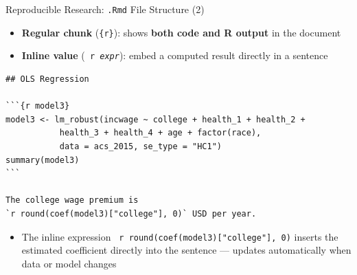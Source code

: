 \documentclass[dvipsnames,hyperref={pdfpagelabels=false}]{beamer}
\begin{document}
\begin{frame}[fragile]{Reproducible Research: \texttt{.Rmd} File Structure (2)}

	\begin{itemize}
		\item \textbf{Regular chunk} (\texttt{\{r\}}): shows \textbf{both code and R output} in the document
		\vspace{0.2cm}
		\item \textbf{Inline value} (\texttt{{} r \textit{expr}{}}): embed a computed result directly in a sentence
	\end{itemize}

\begin{lstlisting}[language={},basicstyle=\ttfamily\fontsize{7.5}{9}\selectfont,keywordstyle={}]
## OLS Regression

```{r model3}
model3 <- lm_robust(incwage ~ college + health_1 + health_2 +
           health_3 + health_4 + age + factor(race),
           data = acs_2015, se_type = "HC1")
summary(model3)
```

The college wage premium is
`r round(coef(model3)["college"], 0)` USD per year.
\end{lstlisting}

	\begin{itemize}
		\item The inline expression \texttt{{} r round(coef(model3)["college"], 0){}} inserts the estimated coefficient directly into the sentence --- updates automatically when data or model changes
	\end{itemize}

\end{frame}
\end{document}
